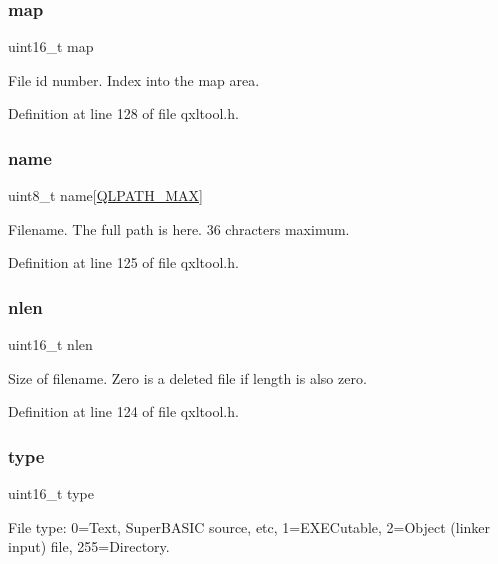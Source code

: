 \subsubsection{\texorpdfstring{map}{map}}
{\footnotesize\ttfamily uint16\+\_\+t map}

File id number. Index into the map area. 

Definition at line 128 of file qxltool.\+h.

\mbox{\label{struct_q_l_d_i_r_a9b899bc186aef90a5f62cf48e1382106}} 
\subsubsection{\texorpdfstring{name}{name}}
{\footnotesize\ttfamily uint8\+\_\+t name\mbox{[}\hyperlink{qxltool_8h_a723f2285fc63a29eaecf346acf4c184b}{Q\+L\+P\+A\+T\+H\+\_\+\+M\+AX}\mbox{]}}

Filename. The full path is here. 36 chracters maximum. 

Definition at line 125 of file qxltool.\+h.

\mbox{\label{struct_q_l_d_i_r_a2b7cf049da1288b6cd8e8380a4455f1e}} 
\subsubsection{\texorpdfstring{nlen}{nlen}}
{\footnotesize\ttfamily uint16\+\_\+t nlen}

Size of filename. Zero is a deleted file if length is also zero. 

Definition at line 124 of file qxltool.\+h.

\mbox{\label{struct_q_l_d_i_r_acb5cfd209ba75c853d03f701e7f91679}} 
\subsubsection{\texorpdfstring{type}{type}}
{\footnotesize\ttfamily uint16\+\_\+t type}

File type\+: 0=Text, Super\+B\+A\+S\+IC source, etc, 1=E\+X\+E\+Cutable, 2=Object (linker input) file, 255=Directory. 

